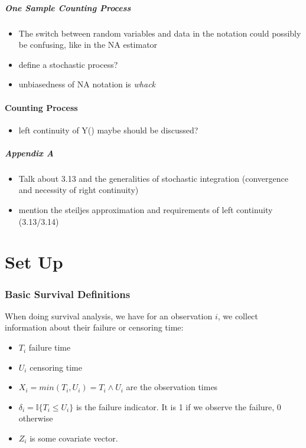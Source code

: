 \documentclass[10pt]{article}
\begin{document}
        \subsubsection{One Sample Counting Process}
        \begin{itemize}
             \item The switch between random variables and data in the notation could possibly be confusing, like in the NA estimator
            \item define a stochastic process?
            \item unbiasedness of NA notation is \textit{whack}
        \end{itemize}
        \subsection{Counting Process}
        \begin{itemize}
            \item left continuity of Y() maybe should be discussed?
        \end{itemize}
        \subsubsection{Appendix A}
        \begin{itemize}
            \item Talk about 3.13 and the generalities of stochastic integration (convergence and necessity of right continuity)
            \item mention the steiljes approximation and requirements of left continuity (3.13/3.14)
        \end{itemize}


\newpage
 
	\part{Set Up}

    

    \section{Basic Survival Definitions}

    When doing survival analysis, we have for an observation $i$, we collect information about their failure or censoring time:
    \begin{itemize}
        \item $T_i$ failure time
        \item $U_i$ censoring time
        \item $X_i = min(T_i, U_i) = T_i \wedge U_i$ are the observation times
        \item $\delta_i = \mathbb{I}\{T_i \leq U_i\}$ is the failure indicator. It is 1 if we observe the failure, 0 otherwise
        \item $Z_i$ is some covariate vector.
    \end{itemize}
\end{document}
